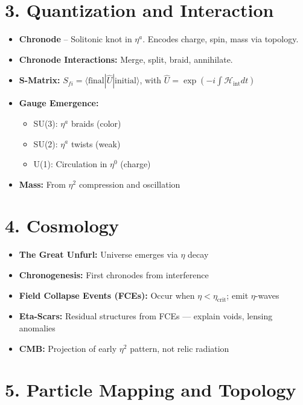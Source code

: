 \documentclass[12pt]{article}
\begin{document}
\section*{3. Quantization and Interaction}

\begin{itemize}
\item \textbf{Chronode} – Solitonic knot in $\eta^a$. Encodes charge, spin, mass via topology.
\item \textbf{Chronode Interactions:} Merge, split, braid, annihilate.
\item \textbf{S-Matrix:} $S_{fi} = \langle \text{final} | \hat{U} | \text{initial} \rangle$, with $\hat{U} = \exp\left( -i \int \mathcal{H}_{\text{int}} dt \right)$
\item \textbf{Gauge Emergence:}
  \begin{itemize}
  \item SU(3): $\eta^a$ braids (color)
  \item SU(2): $\eta^a$ twists (weak)
  \item U(1): Circulation in $\eta^0$ (charge)
  \end{itemize}
\item \textbf{Mass:} From $\eta^2$ compression and oscillation
\end{itemize}

\section*{4. Cosmology}

\begin{itemize}
\item \textbf{The Great Unfurl:} Universe emerges via $\eta$ decay
\item \textbf{Chronogenesis:} First chronodes from interference
\item \textbf{Field Collapse Events (FCEs):} Occur when $\eta < \eta_{\text{crit}}$; emit $\eta$-waves
\item \textbf{Eta-Scars:} Residual structures from FCEs — explain voids, lensing anomalies
\item \textbf{CMB:} Projection of early $\eta^2$ pattern, not relic radiation
\end{itemize}

\section*{5. Particle Mapping and Topology}
\end{document}
